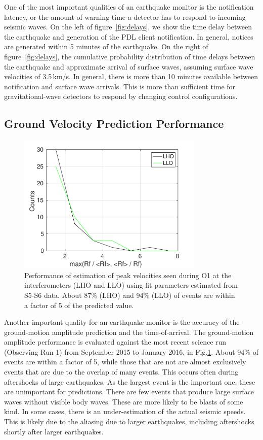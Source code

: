 \documentclass[reprint, prl, aps, showpacs]{revtex4-1}
\begin{document}
One of the most important qualities of an earthquake monitor is the notification latency, or the amount of warning time a detector has to respond to incoming seismic waves.
On the left of figure~\ref{fig:delays}, we show the time delay between the earthquake and generation of the PDL client notification. In general, notices are generated within 5 minutes of the earthquake. On the right of figure~\ref{fig:delays},
the cumulative probability distribution of time delays between the earthquake and approximate arrival of surface waves, assuming surface wave velocities of 3.5\,km/s. 
In general, there is more than 10 minutes available between notification and surface wave arrivals.
This is more than sufficient time for gravitational-wave detectors to respond by changing control configurations.

\subsection{Ground Velocity Prediction Performance}

\begin{figure}[t]
\hspace*{-0.5cm}
 \includegraphics[width=3.5in]{pred_diff.pdf}
 \caption{Performance of estimation of peak velocities seen during O1 at the interferometers (LHO and LLO) using fit parameters estimated from S5-S6 data. About 87\% (LHO) and 94\% (LLO) of events are within a factor of 5 of the predicted value.}
 \label{fig:regressionperf}
\end{figure}

Another important quality for an earthquake monitor is the accuracy of the ground-motion amplitude prediction and the time-of-arrival.
The ground-motion amplitude performance is evaluated against the most recent science run (Observing Run 1) from September 2015 to January 2016, in Fig.\ref{fig:regressionperf}. About 94\% of events are within a factor of 5, while those that are not are almost exclusively events that are due to the overlap of many events. This occurs often during aftershocks of large earthquakes. As the largest event is the important one, these are unimportant for predictions. There are few events that produce large surface waves without visible body waves. These are more likely to be blasts of some kind.
In some cases, there is an under-estimation of the actual seismic speeds.
This is likely due to the aliasing due to larger earthquakes, including aftershocks shortly after larger earthquakes.
\end{document}
